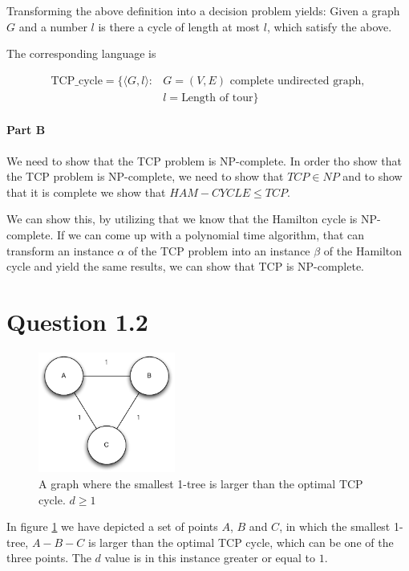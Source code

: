\documentclass[10pt]{article}
\begin{document}
Transforming the above definition into a decision problem yields: Given a graph $G$ and a number $l$ is there a cycle of length at most $l$, which satisfy the above.

The corresponding language is

\begin{align*}
   \text{TCP_cycle} = \{ \langle G, l \rangle : &G = (V,E) \text{ complete undirected graph},\\ 
                                               &l = \text{Length of tour}  \}
\end{align*}


\paragraph{Part B} %
\label{par:part_b}
We need to show that the TCP problem is NP-complete. In order tho show that the TCP problem is NP-complete, we need to show that $TCP \in NP$ and to show that it is complete we show that $HAM-CYCLE \leq TCP$.

We can show this, by utilizing that we know that the Hamilton cycle is NP-complete. If we can come up with a polynomial time algorithm, that can transform an instance $\alpha$ of the TCP problem into an instance $\beta$ of the Hamilton cycle and yield the same results, we can show that TCP is NP-complete.



\section*{Question 1.2} %
\label{sec:question_1_2}

\begin{figure}
	\centering
	\includegraphics[width=0.4\textwidth]{figures/unicycle.pdf}
	\caption{A graph where the smallest 1-tree is larger than the optimal TCP cycle. $d \geq 1$}
	\label{unicycle}
\end{figure}
In figure \ref{unicycle} we have depicted a set of points $A$, $B$ and $C$, in which the smallest 1-tree, $A-B-C$ is larger than the optimal TCP cycle, which can be one of the three points.
The $d$ value is in this instance greater or equal to $1$.
\end{document}
